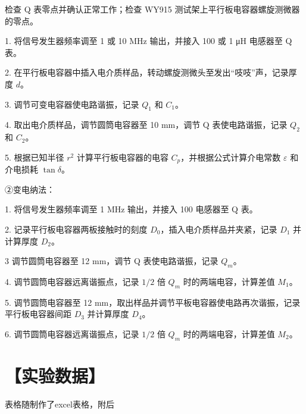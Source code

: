 \documentclass[a4paper,utf8]{article}
\begin{document}
检查 Q 表零点并确认正常工作；检查 WY915 测试架上平行板电容器螺旋测微器的零点。

1. 将信号发生器频率调至 1 或 10 MHz 输出，并接入 100 或 1 μH 电感器至 Q 表。

2. 在平行板电容器中插入电介质样品，转动螺旋测微头至发出“吱吱”声，记录厚度 $d$。

3. 调节可变电容器使电路谐振，记录 $Q_1$ 和 $C_1$。

4. 取出电介质样品，调节圆筒电容器至 10 mm，调节 Q 表使电路谐振，记录 $Q_2$ 和 $C_2$。

5. 根据已知半径 $r^2$ 计算平行板电容器的电容 $C_p$，并根据公式计算介电常数 $\varepsilon$ 和介电损耗 $\tan\delta$。

②变电纳法：

1. 将信号发生器频率调至 1 MHz 输出，并接入 100 电感器至 Q 表。

2. 记录平行板电容器两板接触时的刻度 $D_0$，插入电介质样品并夹紧，记录 $D_1$ 并计算厚度 $D_2$。

3 调节圆筒电容器至 12 mm，调节 Q 表使电路谐振，记录 $Q_m$。

4. 调节圆筒电容器远离谐振点，记录 $1/2$ 倍 $Q_m$ 时的两端电容，计算差值 $M_1$。

5. 调节圆筒电容器至 12 mm，取出样品并调节平板电容器使电路再次谐振，记录平行板电容器间距 $D_3$ 并计算厚度 $D_4$。

6. 调节圆筒电容器远离谐振点，记录 $1/2$ 倍 $Q_m$ 时的两端电容，计算差值 $M_2$。

\section*{【实验数据】}
    表格随制作了excel表格，附后
\end{document}
